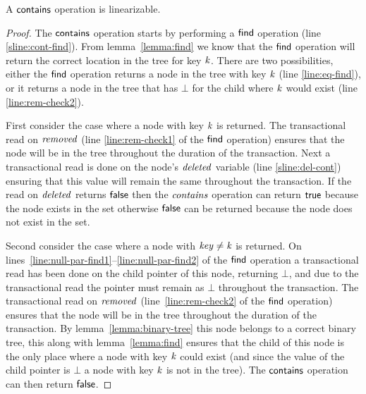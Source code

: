 \begin{theorem}
\label{theorem:contains-valid}
A $\act{contains}$ operation is linearizable.
\end{theorem}
\begin{proof}
The $\act{contains}$ operation starts by performing a $\act{find}$ operation (line \ref{sline:cont-find}).
From lemma~\ref{lemma:find} we know that the $\act{find}$ operation will return the correct location in the tree for key $\ms{k}$.
There are two possibilities, either the $\act{find}$ operation returns a node in the tree with key $\ms{k}$ (line \ref{line:eq-find}),
or it returns a node in the tree that has $\bot$ for the child where $\ms{k}$ would exist (line \ref{line:rem-check2}).

First consider the case where a node with key $\ms{k}$ is returned.
The transactional read on $\ms{removed}$ (line \ref{line:rem-check1} of the $\act{find}$ operation) ensures that the node will be in the tree throughout the duration of the transaction.
Next a transactional read is done on the node's $\ms{deleted}$ variable (line \ref{sline:del-cont}) ensuring that this value will remain the same throughout the transaction.
If the read on $\ms{deleted}$ returns $\lit{false}$ then the $\ms{contains}$ operation can return $\lit{true}$ because the node exists in the set
otherwise $\lit{false}$ can be returned because the node does not exist in the set.

Second consider the case where a node with $\ms{key} \neq \ms{k}$ is returned.
On lines~\ref{line:null-par-find1}--\ref{line:null-par-find2} of the $\act{find}$ operation a transactional read has been done on the child pointer of this node, returning $\bot$, and due to the transactional read the pointer must remain as $\bot$
throughout the transaction.
The transactional read on $\ms{removed}$ (line~\ref{line:rem-check2} of the $\act{find}$ operation) ensures that the node will be in the tree throughout the duration of the transaction.
By lemma~\ref{lemma:binary-tree} this node belongs to a correct binary tree, this along with lemma~\ref{lemma:find} ensures that the child of this node is the only place where a node with key $\ms{k}$ could exist
(and since the value of the child pointer is $\bot$ a node with key $\ms{k}$ is not in the tree).
The $\act{contains}$ operation can then return $\lit{false}$.
\end{proof}



